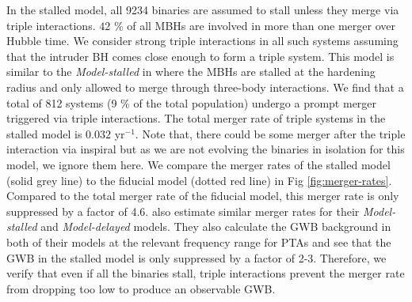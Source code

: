 \documentclass[11pt, letterpaper]{article}
\begin{document}
In the stalled model, all 9234 binaries are assumed to stall unless they merge via triple interactions. $42$ \% of all MBHs are involved in more than one merger over Hubble time. We consider strong triple interactions in all such systems assuming that the intruder BH comes close enough to form a triple system. This model is similar to the \emph{Model-stalled} in \cite{bonetti_post-newtonian_2019} where the MBHs are stalled at the hardening radius and only allowed to merge through three-body interactions. We find that a total of 812 systems (9 \% of the total population) undergo a prompt merger triggered via triple interactions. The total merger rate of triple systems in the stalled model is $0.032$ yr$^{-1}$. Note that, there could be some merger after the triple interaction via inspiral but as we are not evolving the binaries in isolation for this model, we ignore them here. We compare the merger rates of the stalled model (solid grey line) to the fiducial model (dotted red line) in Fig \ref{fig:merger-rates}. Compared to the total merger rate of the fiducial model, this merger rate is only suppressed by a factor of 4.6. \cite{bonetti_post-newtonian_2019} also estimate similar merger rates for their \emph{Model-stalled} and \emph{Model-delayed} models. They also calculate the GWB background in both of their models at the relevant frequency range for PTAs and see that the GWB in the stalled model is only suppressed by a factor of 2-3. Therefore, we verify that even if all the binaries stall, triple interactions prevent the merger rate from dropping too low to produce an observable GWB.
\end{document}

